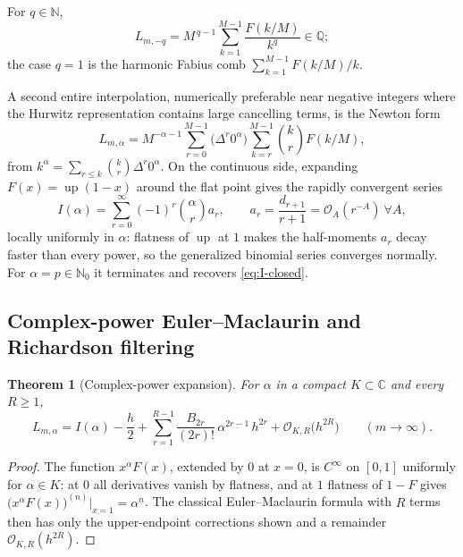 \documentclass[11pt,oneside]{article}
\numberwithin{equation}{section}
\newtheorem{theorem}{Theorem}[section]
\theoremstyle{definition}
\theoremstyle{remark}
\newcommand{\C}{\mathbb C}
\newcommand{\Q}{\mathbb Q}
\newcommand{\N}{\mathbb N}
\newcommand{\Up}{\operatorname{up}}
\newcommand{\bigO}{\mathcal O}
\newcommand{\fall}[2]{#1^{\underline{#2}}}
\begin{document}
\begin{corollary}
\label{cor:negative-rational}
For $q\in\N$,
\begin{equation}
 L_{m,-q}
 =M^{\,q-1}\sum_{k=1}^{M-1}\frac{F(k/M)}{k^{q}}\in\Q;
 \label{eq:negative-rational}
\end{equation}
the case $q=1$ is the harmonic Fabius comb
$\sum_{k=1}^{M-1}F(k/M)/k$.
\end{corollary}

A second entire interpolation, numerically preferable near negative
integers where the Hurwitz representation contains large cancelling
terms, is the Newton form
\begin{equation}
 L_{m,\alpha}=M^{-\alpha-1}
 \sum_{r=0}^{M-1}\bigl(\Delta^{r}0^{\alpha}\bigr)
 \sum_{k=r}^{M-1}\binom kr F(k/M),
 \label{eq:Newton-comb}
\end{equation}
from $k^{\alpha}=\sum_{r\le k}\binom kr\Delta^{r}0^{\alpha}$.  On the
continuous side, expanding $F(x)=\Up(1-x)$ around the flat point gives
the rapidly convergent series
\begin{equation}
 I(\alpha)=\sum_{r=0}^{\infty}(-1)^{r}\binom{\alpha}{r}a_r,
 \qquad
 a_r=\frac{d_{r+1}}{r+1}
 =\bigO_A(r^{-A})\ \forall A,
 \label{eq:I-alpha-series}
\end{equation}
locally uniformly in $\alpha$: flatness of $\Up$ at $1$ makes the
half-moments $a_r$ decay faster than every power, so the generalized
binomial series converges normally.  For $\alpha=p\in\N_0$ it
terminates and recovers \eqref{eq:I-closed}.

\subsection{Complex-power Euler--Maclaurin and Richardson filtering}

\begin{theorem}[Complex-power expansion]
\label{thm:complex-EM}
For $\alpha$ in a compact $K\subset\C$ and every $R\ge1$,
\begin{equation}
 L_{m,\alpha}
 =I(\alpha)-\frac h2
 +\sum_{r=1}^{R-1}\frac{B_{2r}}{(2r)!}\,
 \fall{\alpha}{2r-1}\,h^{2r}
 +\bigO_{K,R}\bigl(h^{2R}\bigr)
 \qquad(m\to\infty).
 \label{eq:complex-EM}
\end{equation}
\end{theorem}

\begin{proof}
The function $x^{\alpha}F(x)$, extended by $0$ at $x=0$, is
$C^\infty$ on $[0,1]$ uniformly for $\alpha\in K$: at $0$ all
derivatives vanish by flatness, and at $1$ flatness of $1-F$ gives
$\bigl(x^{\alpha}F(x)\bigr)^{(n)}\bigl|_{x=1}=\fall\alpha n$.  The
classical Euler--Maclaurin formula with $R$ terms then has only the
upper-endpoint corrections shown and a remainder
$\bigO_{K,R}(h^{2R})$.
\end{proof}
\end{document}
